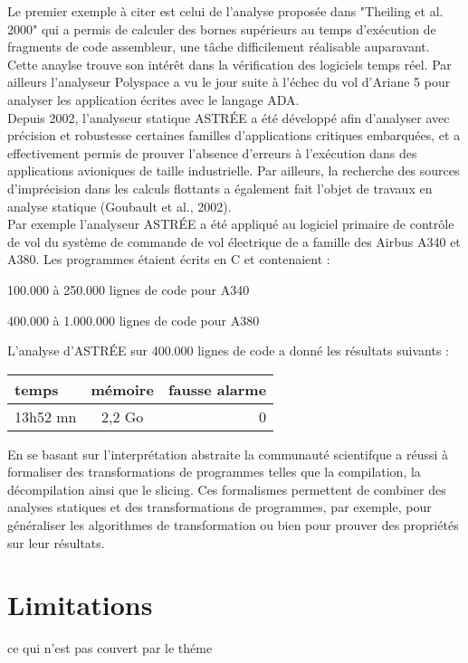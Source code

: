 \documentclass[french]{report}
\begin{document}
Le premier exemple à citer est celui de l'analyse proposée dans "Theiling et al. 2000" qui a permis de calculer des bornes supérieurs au temps d'exécution de fragments de code assembleur, une tâche difficilement réalisable auparavant. Cette anaylse trouve son intérêt dans la vérification des logiciels temps réel. Par ailleurs l'analyseur Polyspace a vu le jour suite à l'échec du vol d'Ariane 5 pour analyser les application écrites avec le langage ADA. \\

Depuis 2002, l’analyseur statique ASTRÉE a été développé afin d’analyser avec précision et robustesse certaines familles d’applications critiques embarquées, et a effectivement
permis de prouver l’absence d’erreurs à l’exécution dans des applications avioniques
de taille industrielle. Par ailleurs, la recherche des sources d’imprécision dans les calculs flottants a également fait l’objet de travaux en analyse statique (Goubault et al., 2002). \\

Par exemple l'analyseur ASTRÉE a été appliqué au logiciel primaire de contrôle de vol du système de commande de vol électrique de a famille des Airbus A340 et A380. Les programmes étaient écrits en C et contenaient : \\
\begin{description}
	\item 100.000 à 250.000 lignes de code pour A340
    \item 400.000 à 1.000.000 lignes de code pour A380 \\
\end{description}

L'analyse d'ASTRÉE sur 400.000 lignes de code a donné les résultats suivants : \\
\begin{center}
\begin{tabular}{|l|c|r|}
  \hline
  temps & mémoire & fausse alarme \\
  \hline
  13h52 mn & 2,2 Go & 0 \\
  \hline
\end{tabular} 
\end{center}
 
En se basant sur l'interprétation abstraite la communauté scientifque a réussi à formaliser des transformations de programmes telles que la compilation, la décompilation ainsi que le slicing. Ces formalismes permettent de combiner des analyses statiques et des transformations de programmes, par exemple, pour généraliser les algorithmes de transformation ou bien pour prouver des propriétés sur leur résultats.


\section{Limitations}

ce qui n'est pas couvert par le théme
\end{document}
